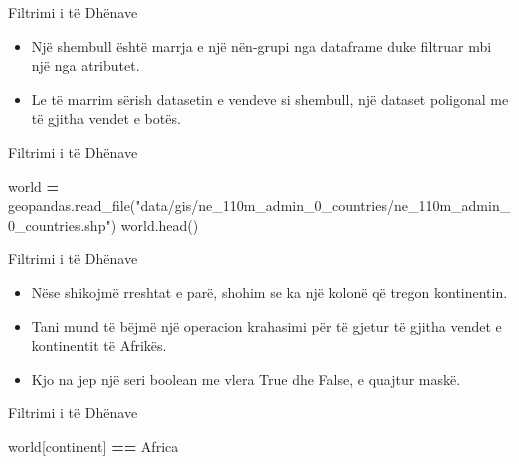 \documentclass[
  ignorenonframetext,
]{beamer}
\newenvironment{Shaded}{\begin{snugshade}}{\end{snugshade}}
\newcommand{\NormalTok}[1]{#1}
\newcommand{\OperatorTok}[1]{\textcolor[rgb]{0.81,0.36,0.00}{\textbf{#1}}}
\newcommand{\StringTok}[1]{\textcolor[rgb]{0.31,0.60,0.02}{#1}}
\begin{document}
\begin{frame}{Filtrimi i të Dhënave}
\protect\hypertarget{filtrimi-i-tuxeb-dhuxebnave}{}
\begin{itemize}
\item
  Një shembull është marrja e një nën-grupi nga dataframe duke filtruar
  mbi një nga atributet.
\item
  Le të marrim sërish datasetin e vendeve si shembull, një dataset
  poligonal me të gjitha vendet e botës.
\end{itemize}
\end{frame}

\begin{frame}[fragile]{Filtrimi i të Dhënave}
\protect\hypertarget{filtrimi-i-tuxeb-dhuxebnave-1}{}

\begin{Shaded}
\begin{Highlighting}[]
\NormalTok{world }\OperatorTok{=}\NormalTok{ geopandas.read\_file(}\StringTok{"data/gis/ne\_110m\_admin\_0\_countries/ne\_110m\_admin\_0\_countries.shp"}\NormalTok{)}
\NormalTok{world.head()}
\end{Highlighting}
\end{Shaded}
\end{frame}

\begin{frame}{Filtrimi i të Dhënave}
\protect\hypertarget{filtrimi-i-tuxeb-dhuxebnave-2}{}
\begin{itemize}
\item
  Nëse shikojmë rreshtat e parë, shohim se ka një kolonë që tregon
  kontinentin.
\item
  Tani mund të bëjmë një operacion krahasimi për të gjetur të gjitha
  vendet e kontinentit të Afrikës.
\item
  Kjo na jep një seri boolean me vlera True dhe False, e quajtur maskë.
\end{itemize}
\end{frame}

\begin{frame}[fragile]{Filtrimi i të Dhënave}
\protect\hypertarget{filtrimi-i-tuxeb-dhuxebnave-3}{}

\begin{Shaded}
\begin{Highlighting}[]
\NormalTok{world[}\StringTok{\textquotesingle{}continent\textquotesingle{}}\NormalTok{] }\OperatorTok{==} \StringTok{\textquotesingle{}Africa\textquotesingle{}}
\end{Highlighting}
\end{Shaded}
\end{frame}
\end{document}
